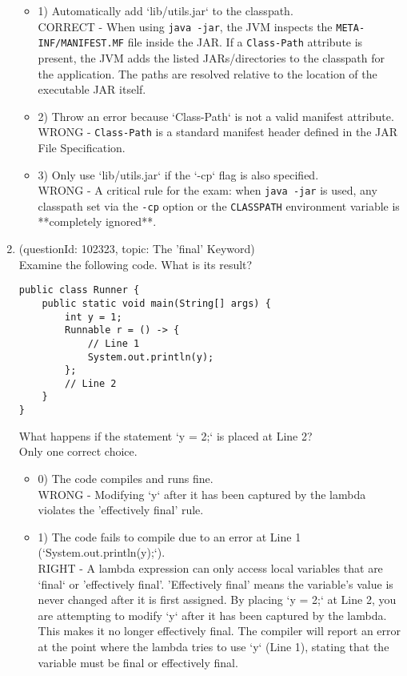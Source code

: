 \documentclass[12pt]{article}
\begin{document}
\begin{enumerate}[label=(\arabic*)]
\begin{itemize}
\item 1) Automatically add `lib/utils.jar` to the classpath.
 \\ 
CORRECT - When using \verb|java -jar|, the JVM inspects the \verb|META-INF/MANIFEST.MF| file inside the JAR. If a \verb|Class-Path| attribute is present, the JVM adds the listed JARs/directories to the classpath for the application. The paths are resolved relative to the location of the executable JAR itself.

\item 2) Throw an error because `Class-Path` is not a valid manifest attribute.
 \\ 
WRONG - \verb|Class-Path| is a standard manifest header defined in the JAR File Specification.

\item 3) Only use `lib/utils.jar` if the `-cp` flag is also specified.
 \\ 
WRONG - A critical rule for the exam: when \verb|java -jar| is used, any classpath set via the \verb|-cp| option or the \verb|CLASSPATH| environment variable is **completely ignored**.

\end{itemize}
\item (questionId: 102323, topic: The 'final' Keyword) \\ 
Examine the following code. What is its result?\n\begin{verbatim}
public class Runner {
    public static void main(String[] args) {
        int y = 1;
        Runnable r = () -> {
            // Line 1
            System.out.println(y);
        };
        // Line 2
    }
}
\end{verbatim}
What happens if the statement `y = 2;` is placed at Line 2?
\\ \noindent Only one correct choice. 
\begin{itemize}
\item 0) The code compiles and runs fine.
 \\ 
WRONG - Modifying `y` after it has been captured by the lambda violates the 'effectively final' rule.

\item 1) The code fails to compile due to an error at Line 1 (`System.out.println(y);`).
 \\ 
RIGHT - A lambda expression can only access local variables that are `final` or 'effectively final'. 'Effectively final' means the variable's value is never changed after it is first assigned. By placing `y = 2;` at Line 2, you are attempting to modify `y` after it has been captured by the lambda. This makes it no longer effectively final. The compiler will report an error at the point where the lambda tries to use `y` (Line 1), stating that the variable must be final or effectively final.


\end{itemize}
\end{enumerate}
\end{document}

